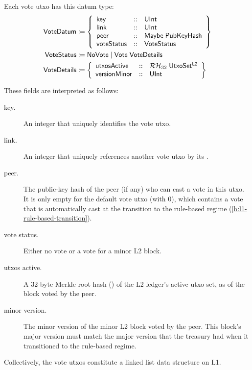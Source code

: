 \documentclass[../hydrozoa.tex]{subfiles}
\begin{document}
Each vote utxo has this datum type:
\begin{equation*}
\begin{split}
  \mathsf{VoteDatum} &\coloneq \left\{
    \begin{array}{lll}
      \mathsf{key}  &::& \mathsf{UInt} \\
      \mathsf{link} &::& \mathsf{UInt} \\
      \mathsf{peer} &::& \mathsf{Maybe} \; \mathsf{PubKeyHash} \\
      \mathsf{voteStatus} &::& \mathsf{VoteStatus}
    \end{array}\right\}\\
  \mathsf{VoteStatus} &\coloneq \mathsf{NoVote} \mid \mathsf{Vote} \; \mathsf{VoteDetails} \\
  \mathsf{VoteDetails} &\coloneq \left\{
    \begin{array}{lll}
      \mathsf{utxosActive} &::& \mathcal{RH}_{32} \; \mathsf{UtxoSet^{L2}} \\
      \mathsf{versionMinor} &::& \mathsf{UInt}
    \end{array}\right\}
\end{split}
\end{equation*}

These fields are interpreted as follows:
\begin{description}
  \item[key.] An integer that uniquely identifies the vote utxo.
  \item[link.] An integer that uniquely references another vote utxo by its .
  \item[peer.] The public-key hash of the peer (if any) who can cast a vote in this utxo.
  It is only empty for the default vote utxo (with  0), which contains a vote that is automatically cast at the transition to the rule-based regime (\cref{h:l1-rule-based-transition}).
  \item[vote status.] Either no vote or a vote for a minor L2 block.
  \item[utxos active.] A 32-byte Merkle root hash () of the L2 ledger's active utxo set, as of the block voted by the peer.
  \item[minor version.] The minor version of the minor L2 block voted by the peer.
  This block's major version must match the major version that the treasury had when it transitioned to the rule-based regime.
\end{description}

Collectively, the vote utxos constitute a linked list data structure on L1.
\end{document}
